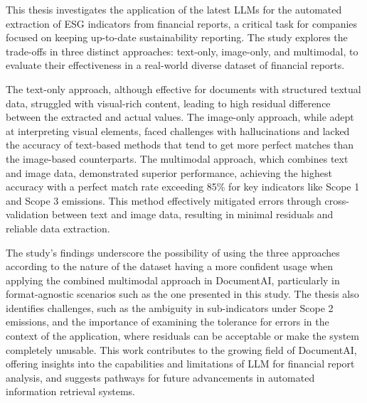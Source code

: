 \documentclass[english, 12pt, a4paper, elec, utf8, a-2b, online]{aaltothesis}
\date{26 September 2024}
\begin{document}
\makecoverpage

\makecopyrightpage

\clearpage

\begin{abstractpage}[english]
This thesis investigates the application of the latest \ac{LLM}s for the automated extraction of \ac{ESG} indicators from financial reports, a critical task for companies focused on keeping up-to-date sustainability reporting.
The study explores the trade-offs in three distinct approaches: text-only, image-only, and multimodal, to evaluate their effectiveness in a real-world diverse dataset of financial reports.

The text-only approach, although effective for documents with structured textual data, struggled with visual-rich content, leading to high residual difference between the extracted and actual values.
The image-only approach, while adept at interpreting visual elements, faced challenges with hallucinations and lacked the accuracy of text-based methods that tend to get more perfect matches than the image-based counterparts.
The multimodal approach, which combines text and image data, demonstrated superior performance, achieving the highest accuracy with a perfect match rate exceeding 85\% for key indicators like Scope 1 and Scope 3 emissions.
This method effectively mitigated errors through cross-validation between text and image data, resulting in minimal residuals and reliable data extraction.

The study's findings underscore the possibility of using the three approaches according to the nature of the dataset having a more confident usage when applying the combined multimodal approach in DocumentAI, particularly in format-agnostic scenarios such as the one presented in this study.
The thesis also identifies challenges, such as the ambiguity in sub-indicators under Scope 2 emissions, and the importance of examining the tolerance for errors in the context of the application, where residuals can be acceptable or make the system completely unusable.
This work contributes to the growing field of DocumentAI, offering insights into the capabilities and limitations of \ac{LLM} for financial report analysis, and suggests pathways for future advancements in automated information retrieval systems.
\end{abstractpage}
\end{document}
